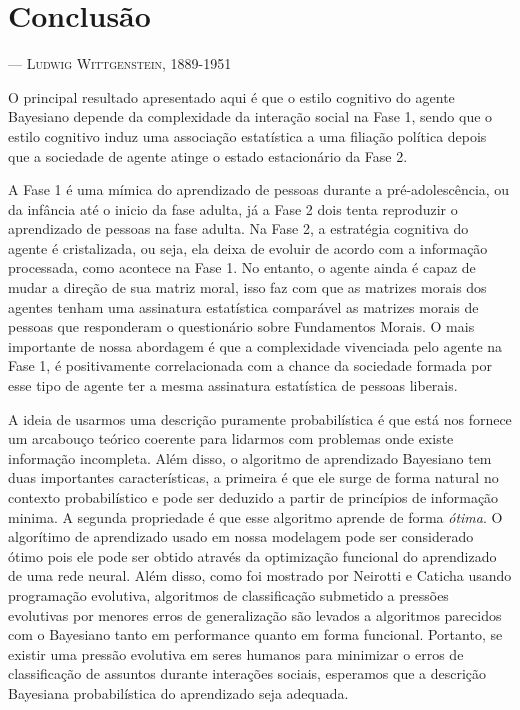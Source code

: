 \chapter{Conclusão}
\begin{epigraphs}
{\---- \textsc{Ludwig Wittgenstein, 1889-1951}}
\end{epigraphs}

O principal resultado apresentado aqui é que o estilo cognitivo do agente
Bayesiano depende da complexidade da interação social na Fase 1, sendo que
o estilo cognitivo induz uma associação estatística a uma filiação política
depois que a sociedade de agente atinge o estado estacionário da Fase 2.

A Fase 1 é uma mímica do aprendizado de pessoas durante a pré-adolescência,
ou da infância até o inicio da fase adulta, já a Fase 2 dois tenta
reproduzir o aprendizado de pessoas na fase adulta. Na Fase 2, a estratégia
cognitiva do agente é cristalizada, ou seja, ela deixa de evoluir de acordo
com a informação processada, como acontece na Fase 1. No entanto, o agente
ainda é capaz de mudar a direção de sua matriz moral, isso faz com que as
matrizes morais dos agentes tenham uma assinatura estatística comparável as
matrizes morais de pessoas que responderam o questionário sobre Fundamentos
Morais. O mais importante de nossa abordagem é que a complexidade vivenciada
pelo agente na Fase 1, é positivamente correlacionada com a chance da
sociedade formada por esse tipo de agente ter a mesma assinatura estatística
de pessoas liberais.

A ideia de usarmos uma descrição puramente probabilística é que está
nos fornece um arcabouço teórico coerente para lidarmos com problemas onde
existe informação incompleta. Além
disso, o algoritmo de aprendizado Bayesiano tem duas importantes
características, a primeira é que ele surge de forma natural no contexto
probabilístico e pode ser deduzido a partir de princípios de informação
minima\citep{CatichaA2012}. A segunda propriedade é que esse algoritmo aprende
de forma \textit{ótima}. O algorítimo de aprendizado usado em nossa modelagem
pode ser considerado ótimo pois ele pode ser obtido através da optimização
funcional do aprendizado de uma rede neural\cite{Kinouchi1992}. Além
disso, como foi mostrado por Neirotti e Caticha\cite{Neirotti2003} usando
programação evolutiva, algoritmos de classificação submetido a pressões
evolutivas por menores erros de generalização são levados a algoritmos
parecidos com o Bayesiano tanto em performance quanto em forma funcional.
Portanto, se existir uma pressão evolutiva em seres humanos para minimizar o
erros de classificação de assuntos durante interações sociais, esperamos que a
descrição Bayesiana probabilística do aprendizado seja adequada.

